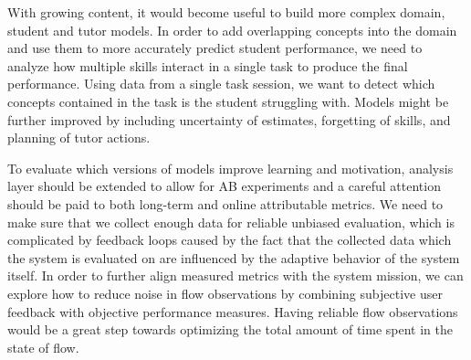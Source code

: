 With growing content, it would become useful to build more complex
domain, student and tutor models. In order to add overlapping concepts
into the domain and use them to more accurately predict student performance,
we need to analyze how multiple skills interact in a single
task to produce the final performance. %
Using data from a single task session,
we want to detect which concepts contained in the task
is the student struggling with.
Models might be further improved by including uncertainty of estimates,
forgetting of skills, and planning of tutor actions.

To evaluate which versions of models improve learning and motivation, %
analysis layer should be extended to allow for AB experiments
and a careful attention should be paid to both long-term and
online attributable metrics.
We need to make sure that we collect enough data for reliable unbiased evaluation,
which is complicated by feedback loops caused by the fact that
the collected data which the system is evaluated on are influenced by the
adaptive behavior of the system itself.
In order to further align measured metrics with the system mission,
we can explore how to reduce noise in flow observations
by combining subjective user feedback with objective performance measures.
Having reliable flow observations would be a great step towards optimizing
the total amount of time spent in the state of flow.

